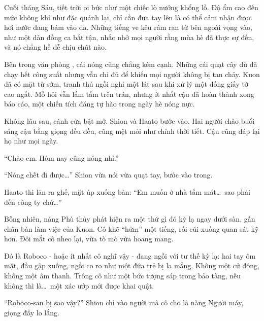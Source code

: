 \documentclass[../main.tex]{subfiles}
\begin{document}

Cuối tháng Sáu, tiết trời oi bức như một chiếc lò nướng khổng lồ. Độ ẩm cao đến mức không khí như đặc quánh lại, chỉ cần đưa tay lên là có thể cảm nhận được hơi nước đang bám vào da. Những tiếng ve kêu râm ran từ bên ngoài vọng vào, như một dàn đồng ca bất tận, nhắc nhở mọi người rằng mùa hè đã thực sự đến, và nó chẳng hề dễ chịu chút nào.

Bên trong văn phòng \hll, cái nóng cũng chẳng kém cạnh. Những cái quạt cây dù đã chạy hết công suất nhưng vẫn chỉ đủ để khiến mọi người không bị tan chảy. Kuon đã có mặt từ sớm, tranh thủ ngồi nghỉ một lát sau khi xử lý một đống giấy tờ cao ngất. Mồ hôi vẫn lấm tấm trên trán, nhưng ít nhất cậu đã hoàn thành xong báo cáo, một chiến tích đáng tự hào trong ngày hè nóng nực.

Không lâu sau, cánh cửa bật mở. Shion và Haato bước vào. Hai người chào buổi sáng cậu bằng giọng đều đều, cũng mệt mỏi như chính thời tiết. Cậu cũng đáp lại họ như mọi ngày.

``Chào em. Hôm nay cũng nóng nhỉ.''

``Nóng chết đi được\dots''  Shion vừa nói vừa quạt tay, bước vào trong.

Haato thì lăn ra ghế, mặt úp xuống bàn: ``Em muốn ở nhà tắm mát\dots\ sao phải đến công ty chứ\dots''

Bỗng nhiên, nàng Phù thủy phát hiện ra một thứ gì đó kỳ lạ ngay dưới sàn, gần chân bàn làm việc của Kuon. Cô khẽ ``hửm'' một tiếng, rồi cúi xuống quan sát kỹ hơn. Đôi mắt cô nheo lại, vừa tò mò vừa hoang mang.

Đó là Roboco - hoặc ít nhất cô nghĩ vậy - đang ngồi với tư thế kỳ lạ: hai tay ôm mặt, đầu gập xuống, ngồi co ro như một đứa trẻ bị la mắng. Không một cử động, không một âm thanh. Trông cô như một bức tượng sáp trong bảo tàng, nếu không thì là\dots\ một xác ướp mới được khai quật.


``Roboco-san bị sao vậy?''  Shion chỉ vào người mà cô cho là nàng Người máy, giọng đầy lo lắng.
\end{document}
